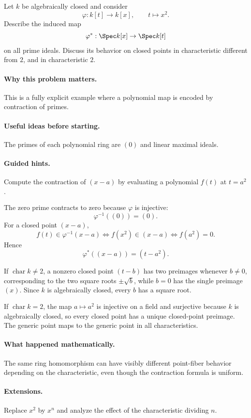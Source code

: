 \begin{problem}
Let $k$ be algebraically closed and consider
\[
\varphi:k[t]\to k[x],\qquad t\mapsto x^2.
\]
Describe the induced map
\[
\varphi^\ast:\Spec k[x]\to\Spec k[t]
\]
on all prime ideals.  Discuss its behavior on closed points in characteristic different from
$2$, and in characteristic $2$.
\end{problem}

\paragraph{Why this problem matters.}
This is a fully explicit example where a polynomial map is encoded by contraction of primes.

\paragraph{Useful ideas before starting.}
The primes of each polynomial ring are $(0)$ and linear maximal ideals.

\paragraph{Guided hints.}
Compute the contraction of $(x-a)$ by evaluating a polynomial $f(t)$ at $t=a^2$.

\begin{solution}
The zero prime contracts to zero because $\varphi$ is injective:
\[
\varphi^{-1}((0))=(0).
\]
For a closed point $(x-a)$,
\[
f(t)\in\varphi^{-1}(x-a)
\iff
f(x^2)\in(x-a)
\iff
f(a^2)=0.
\]
Hence
\[
\varphi^\ast((x-a))=(t-a^2).
\]

If $\operatorname{char}k\neq2$, a nonzero closed point $(t-b)$ has two preimages whenever
$b\neq0$, corresponding to the two square roots $\pm\sqrt b$, while $b=0$ has the single
preimage $(x)$.  Since $k$ is algebraically closed, every $b$ has a square root.

If $\operatorname{char}k=2$, the map $a\mapsto a^2$ is injective on a field and surjective
because $k$ is algebraically closed, so every closed point has a unique closed-point preimage.
The generic point maps to the generic point in all characteristics.
\end{solution}

\paragraph{What happened mathematically.}
The same ring homomorphism can have visibly different point-fiber behavior depending on the
characteristic, even though the contraction formula is uniform.

\paragraph{Extensions.}
Replace $x^2$ by $x^n$ and analyze the effect of the characteristic dividing $n$.
